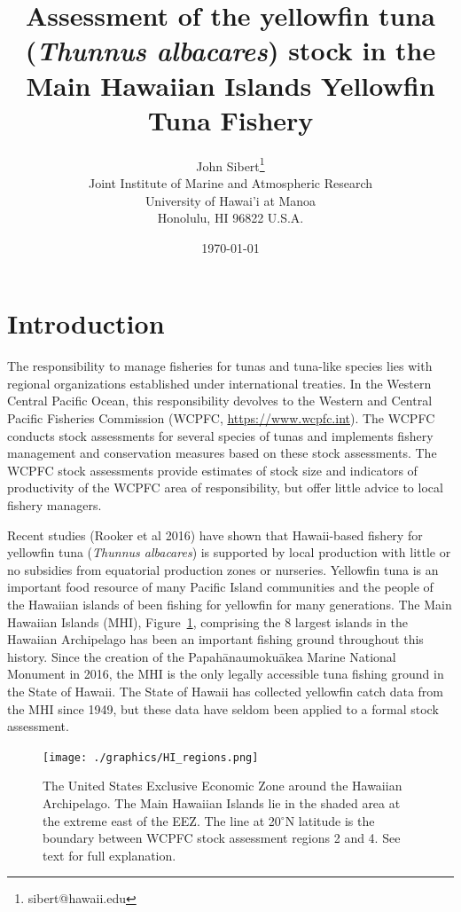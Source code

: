 \documentclass[12pt,letterpaper]{article}
\title{Assessment of the yellowfin tuna ({\it Thunnus albacares}) 
stock in the Main Hawaiian Islands Yellowfin Tuna Fishery}
\author{
John Sibert\thanks{sibert@hawaii.edu}\\
Joint Institute of Marine and Atmospheric Research\\
University of Hawai'i at Manoa\\
Honolulu, HI  96822 U.S.A.\\[0.125in]
\date{\today}
}
\newcommand\doublespacing{\baselineskip=1.6\normalbaselineskip}
\renewcommand\deg[1]{$^\circ$#1}
\newcommand\help[1]{\color{Magenta}{\it #1}\normalcolor}
\begin{document}
\maketitle


\begin{abstract}
\begin{center}\help{Write me!}\end{center}
\end{abstract}


\section*{Introduction}
The responsibility to manage fisheries for tunas and tuna-like species
lies with regional organizations established under international treaties.
In the Western Central Pacific Ocean, this responsibility devolves to
the Western and Central Pacific Fisheries Commission (WCPFC, 
\url{https://www.wcpfc.int}).
The WCPFC conducts stock assessments for several species of tunas and
implements fishery management and conservation measures based on
these stock assessments. The WCPFC stock assessments provide estimates
of stock size and indicators of productivity of the WCPFC area of
responsibility, but offer little advice to local fishery managers.

Recent studies (Rooker et al 2016) have shown that
Hawaii-based fishery for yellowfin tuna ({\it Thunnus albacares}) 
is  supported by local production with
little or no subsidies from equatorial production zones
or nurseries.
Yellowfin tuna is an important food resource
of many Pacific Island communities and the people of the Hawaiian
islands of been fishing for yellowfin for many generations. 
The Main Hawaiian Islands (MHI), Figure~\ref{fig:mhimap},
comprising the 8 largest islands in the Hawaiian Archipelago
has been an important fishing ground throughout this history.
Since the creation of the Papah\={a}naumoku\={a}kea Marine National
Monument in 2016, the MHI is the only legally accessible tuna fishing ground
in the State of Hawaii.
The State of Hawaii has collected yellowfin catch data from the MHI
since 1949, but these data have seldom been applied to a formal stock
assessment.

\begin{figure}
\begin{center}
\texttt{[image: ./graphics/HI\_regions.png]}
\caption{\label{fig:mhimap}
The United States Exclusive Economic Zone around the Hawaiian
Archipelago. The Main Hawaiian Islands lie in the shaded area at the
extreme east of the EEZ. The line at 20\deg{N} latitude is the
boundary between WCPFC stock assessment regions 2 and 4. See text for
full explanation.
}
\end{center}
\end{figure}
\end{document}
